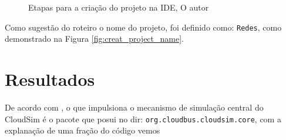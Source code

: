 \begin{figure}[H]
    \center
    \caption{Etapas para a criação do projeto na IDE, O autor}\label{fig:confi_project}
\end{figure}
\par Como sugestão do roteiro o nome do projeto, foi definido como: \verb#Redes#, como demonstrado na Figura \ref{fig:creat_project_name}.




\section{Resultados}
\par De acordo com , o que impulsiona o mecanismo de simulação central do CloudSim é o pacote que posui no dir: \verb#org.cloudbus.cloudsim.core#, com a explanação de uma fração do código vemos


